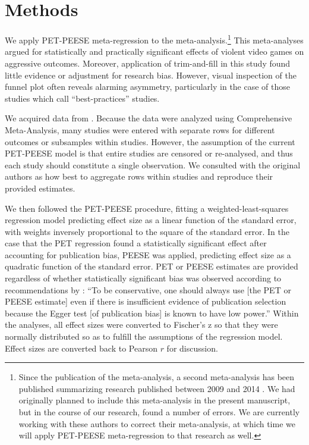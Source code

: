 \documentclass[man]{apa6}
\begin{document}
\section{Methods}
We apply PET-PEESE meta-regression to the \citet{Anderson:etal:2010} meta-analysis.\footnote{Since the publication of the \citet{Anderson:etal:2010} meta-analysis, a second meta-analysis has been published summarizing research published between 2009 and 2014 \citet{Greitemeyer:Mugge:2014}. We had originally planned to include this meta-analysis in the present manuscript, but in the course of our research, found a number of errors. We are currently working with these authors to correct their meta-analysis, at which time we will apply PET-PEESE meta-regression to that research as well.} This meta-analyses argued for statistically and practically significant effects of violent video games on aggressive outcomes. Moreover, application of trim-and-fill in this study found little evidence or adjustment for research bias. However, visual inspection of the funnel plot often reveals alarming asymmetry, particularly in the case of those studies which \citet{Anderson:etal:2010} call ``best-practices'' studies.

We acquired data from \citet{Anderson:etal:2010}. Because the data were analyzed using Comprehensive Meta-Analysis, many studies were entered with separate rows for different outcomes or subsamples within studies. However, the assumption of the current PET-PEESE model is that entire studies are censored or re-analysed, and thus each study should constitute a single observation. We consulted with the original authors as how best to aggregate rows within studies and reproduce their provided estimates.

We then followed the PET-PEESE procedure, fitting a weighted-least-squares regression model predicting effect size as a linear function of the standard error, with weights inversely proportional to the square of the standard error. In the case that the PET regression found a statistically significant effect after accounting for publication bias, PEESE was applied, predicting effect size as a quadratic function of the standard error. PET or PEESE estimates are provided regardless of whether statistically significant bias was observed according to recommendations by \citet[p. 20-21]{Stanley:Doucouliagos:20XX}: ``To be conservative, one should always use [the PET or PEESE estimate] even if there is insufficient evidence of publication selection because the Egger test [of publication bias] is known to have low power.'' Within the analyses, all effect sizes were converted to Fischer's z so that they were normally distributed so as to fulfill the assumptions of the regression model. Effect sizes are converted back to Pearson $r$ for discussion.
\end{document}
